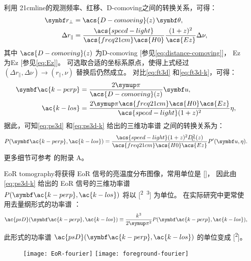 利用 \ac{21cmline}的观测频率、红移、\acl{D-comoving}之间的转换关系，可得：
\begin{align}
  \B{r}_{\perp} & = \acs{D-comoving}(z) \,\B{\theta} , \\
  \Delta r_{\parallel}
    & = \frac{\acs{speed-light}}{\acs{freq21cm} \acs{H0}}
      \frac{(1+z)^2}{\acs{Ez}} \Delta \nu ,
\end{align}
其中 $\acs{D-comoving}(z)$ 为\acl{D-comoving}
[参见\autoref{eq:distance-comoving}]，
\acs{Ez} 为\acl{Ez} [参见\autoref{eq:Ez}]。
可选取合适的坐标系原点，使得上式经过
$(\Delta r_{\parallel}, \Delta\nu) \to (r_{\parallel}, \nu)$
替换后仍然成立。
对比\autoref{eq:ft3d} 和\autoref{eq:ft3d-k}，可得：
\begin{align}
  \B{\ac{k-perp}} & = \frac{2\Cpi}{\acs{D-comoving}(z)} \B{u} ,
  \label{eq:kperp-u}  \\
  \ac{k-los} & =
    \frac{2\Cpi \acs{freq21cm} \acs{H0}\acs{Ez}}{\acs{speed-light}
      (1+z)^2} \eta ,
  \label{eq:klos-eta}
\end{align}
据此，可知\autoref{eq:ps3d} 和\autoref{eq:ps3d-k} 给出的三维功率谱
之间的转换关系为：
\begin{equation}
  P(\B{\ac{k-perp}}, \ac{k-los}) =
    \frac{\acs{speed-light} (1+z)^2 D_{\!C}^2(z)}{
      \acs{freq21cm} \acs{H0} \acs{Ez}}
    P'(\B{u}, \eta) .
\end{equation}
更多细节可参考  的附录 A。

EoR \ac{tomography}将获得 EoR 信号的亮温度分布图像，常用单位是 [\si{\mK}]，
因此由\autoref{eq:ps3d-k} 给出的 EoR 信号的三维功率谱
$P(\B{\ac{k-perp}}, \ac{k-los})$ 将以 [\si{\mK\squared\Mpc\cubed}] 为单位。
在实际研究中更常使用去量纲形式的功率谱 \cite{peacock1996}：
\begin{equation}
  \label{eq:ps3d-k2}
  \ac{psD}(\B{\ac{k-perp}}, \ac{k-los})
    \equiv \frac{k^3}{2\Cpi^2} P(\B{\ac{k-perp}}, \ac{k-los}) ,
\end{equation}
此形式的功率谱 $\ac{psD}(\B{\ac{k-perp}}, \ac{k-los})$
的单位变成 [\si{\mK\squared}]。

\begin{figure}[htp]
  \centering
  \texttt{[image: EoR-fourier]}%
  \texttt{[image: foreground-fourier]}
  \label{fig:eor-fg-fourier}
\end{figure}


